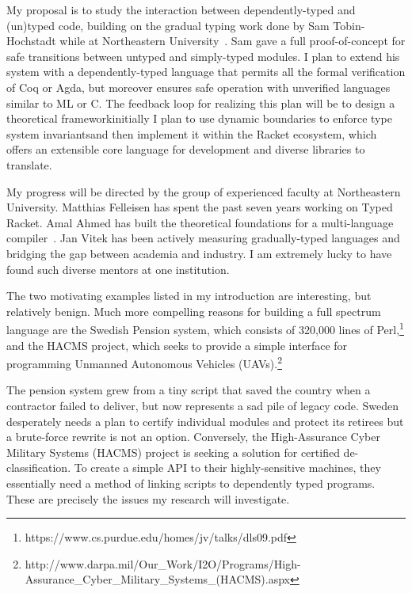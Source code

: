 \documentclass[12pt]{article}
\newcommand{\hdr}[2]{\vspace{-0.4cm}{\flushleft{\hrulefill\\\textbf{#1}\hfill{#2}\\\vspace{-0.2cm}\hrulefill}}\vspace{0.1cm}}
\begin{document}
My proposal is to study the interaction between dependently-typed and (un)typed code, building on the gradual typing work done by Sam Tobin-Hochstadt while at Northeastern University~\cite{tobin2010typed}.
Sam gave a full proof-of-concept for safe transitions between untyped and simply-typed modules.
I plan to extend his system with a dependently-typed language that permits all the formal verification of Coq or Agda, but moreover ensures safe operation with unverified languages similar to ML or C.
The feedback loop for realizing this plan will be to design a theoretical framework\textemdash initially I plan to use dynamic boundaries to enforce type system invariants\textemdash and then implement it within the Racket ecosystem, which offers an extensible core language for development and diverse libraries to translate.

My progress will be directed by the group of experienced faculty at Northeastern University.
Matthias Felleisen has spent the past seven years working on Typed Racket.
Amal Ahmed has built the theoretical foundations for a multi-language compiler~\cite{perconti2014verifying}.
Jan Vitek has been actively measuring gradually-typed languages and bridging the gap between academia and industry.
I am extremely lucky to have found such diverse mentors at one institution.

\newpage

\hdr{Broader Impacts}{}

The two motivating examples listed in my introduction are interesting, but relatively benign.
Much more compelling reasons for building a full spectrum language are the Swedish Pension system, which consists of 320,000 lines of Perl,\footnote{https://www.cs.purdue.edu/homes/jv/talks/dls09.pdf} and the HACMS project, which seeks to provide a simple interface for programming Unmanned Autonomous Vehicles (UAVs).\footnote{http://www.darpa.mil/Our\_Work/I2O/Programs/High-Assurance\_Cyber\_Military\_Systems\_(HACMS).aspx}

The pension system grew from a tiny script that saved the country when a contractor failed to deliver, but now represents a sad pile of legacy code.
Sweden desperately needs a plan to certify individual modules and protect its retirees but a brute-force rewrite is not an option.
Conversely, the High-Assurance Cyber Military Systems (HACMS) project is seeking a solution for certified de-classification.
To create a simple API to their highly-sensitive machines, they essentially need a method of linking scripts to dependently typed programs.
These are precisely the issues my research will investigate.
\end{document}
